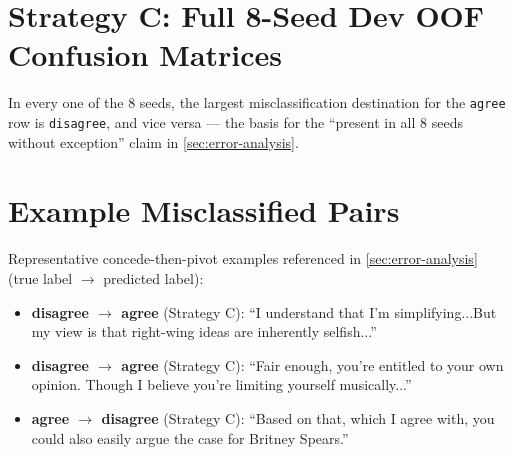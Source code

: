 \section{Strategy C: Full 8-Seed Dev OOF Confusion Matrices}

\begin{table}[htb]
\centering
\noindent{}
\caption{Strategy C dev OOF confusion matrices, all 8 seeds (locked
configuration: warmup=20, epochs=8, weights on)}
\label{table:strategyc-8seed-devoof-cm}
\end{table}

In every one of the 8 seeds, the largest misclassification destination for
the \texttt{agree} row is \texttt{disagree}, and vice versa --- the basis
for the ``present in all 8 seeds without exception'' claim in
\autoref{sec:error-analysis}.

\section{Example Misclassified Pairs}

Representative concede-then-pivot examples referenced in
\autoref{sec:error-analysis} (true label $\to$ predicted label):

\begin{itemize}
\item \textbf{disagree $\to$ agree} (Strategy C): ``I understand that I'm
      simplifying...But my view is that right-wing ideas are inherently
      selfish...''
\item \textbf{disagree $\to$ agree} (Strategy C): ``Fair enough, you're
      entitled to your own opinion. Though I believe you're limiting
      yourself musically...''
\item \textbf{agree $\to$ disagree} (Strategy C): ``Based on that, which I
      agree with, you could also easily argue the case for Britney
      Spears.''
\end{itemize}
